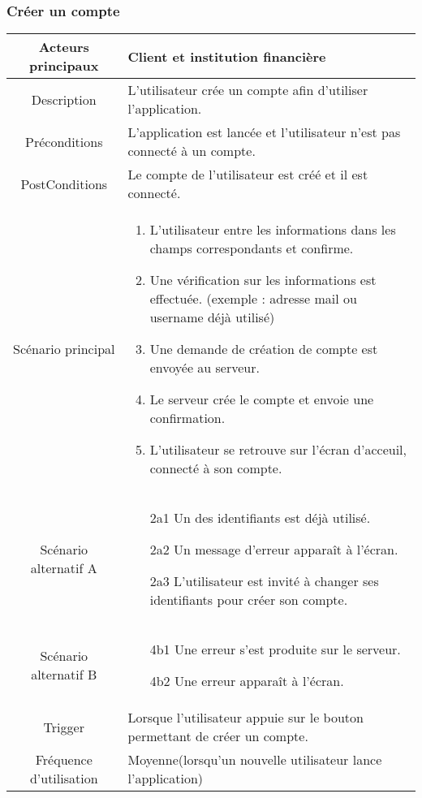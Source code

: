 \documentclass{article}
\begin{document}
\subsubsection{Créer un compte}
\begin{table}[h]
   \begin{tabular}{|c|p{10cm}|}
      \hline
      Acteurs principaux&Client et institution financière\\
      \hline
      Description&L'utilisateur crée un compte afin d'utiliser l'application.\\
      \hline
      Préconditions&L'application est lancée et l'utilisateur n'est pas connecté à un compte.\\
      \hline
      PostConditions&Le compte de l'utilisateur est créé et il est connecté.\\
      \hline
      Scénario principal& 
            \begin{enumerate}
               \item L'utilisateur entre les informations dans les champs correspondants et confirme.
               \item Une vérification sur les informations est effectuée.\linebreak
               (exemple : adresse mail ou username déjà utilisé)
               \item Une demande de création de compte est envoyée au serveur.
               \item Le serveur crée le compte et envoie une confirmation.
               \item L'utilisateur se retrouve sur l'écran d'acceuil, connecté à son compte.
            \end{enumerate}     \\
      \hline
      Scénario alternatif A&
            \begin{itemize}
               \item[2a1] Un des identifiants est déjà utilisé. 
               \item[2a2] Un message d'erreur apparaît à l'écran.
               \item[2a3] L'utilisateur est invité à changer ses identifiants pour créer son compte.  
            \end{itemize}      \\
      \hline
      Scénario alternatif B&
            \begin{itemize}
               \item[4b1] Une erreur s'est produite sur le serveur.
               \item[4b2] Une erreur apparaît à l'écran. 
            \end{itemize} \\
      \hline
      Trigger&Lorsque l'utilisateur appuie sur le bouton permettant de créer un compte.\\
      \hline
      Fréquence d'utilisation&Moyenne(lorsqu'un nouvelle utilisateur lance l'application)\\
      \hline
   \end{tabular}
\end{table}
\end{document}
